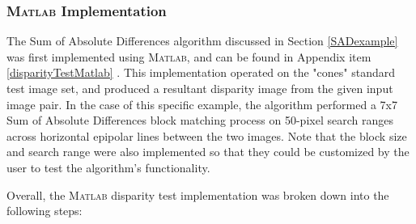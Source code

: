\subsubsection{\textsc{Matlab} Implementation}
The Sum of Absolute Differences algorithm discussed in Section \ref{SADexample} was first implemented using \textsc{Matlab}, and can be found in Appendix item \ref{disparityTestMatlab} \cite{mccormick}. This implementation operated on the "cones" standard test image set, and produced a resultant disparity image from the given input image pair. In the case of this specific example, the algorithm performed a 7x7 Sum of Absolute Differences block matching process on 50-pixel search ranges across horizontal epipolar lines between the two images. Note that the block size and search range were also implemented so that they could be customized by the user to test the algorithm's functionality. 
\par
Overall, the \textsc{Matlab} disparity test implementation was broken down into the following steps:
\par
\singlespacing
